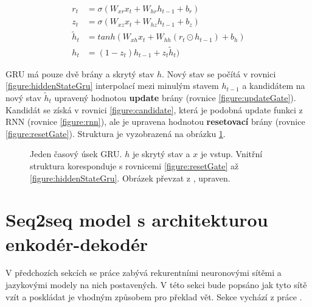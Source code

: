 \begin{align}
    r_{t}&=\sigma(W_{xr}x_{t}+W_{hr}h_{t-1}+b_{r}) \label{figure:resetGate} \\
    z_{t}&=\sigma(W_{xz}x_{t}+W_{hz}h_{t-1}+b_{z}) \label{figure:updateGate} \\
    \tilde{h}_{t}&=tanh(W_{xh}x_t + W_{hh}(r_t \odot h_{t-1}) + b_h) \label{figure:candidate} \\
    h_{t}&=(1 - z_t)h_{t-1} + z_{t}\tilde{h}_{t}) \label{figure:hiddenStateGru}
\end{align}

GRU má pouze dvě brány a skrytý stav $h$. Nový stav se počítá v rovnici \ref{figure:hiddenStateGru} interpolací mezi minulým stavem $h_{t-1}$ a kandidátem na nový stav $\tilde{h}_{t}$ upravený hodnotou \textbf{update} brány (rovnice \ref{figure:updateGate}). Kandidát se získá v rovnici \ref{figure:candidate}, která je podobná update funkci z RNN (rovnice \ref{figure:rnn}), ale je upravena hodnotou \textbf{resetovací} brány (rovnice \ref{figure:resetGate}). Struktura je vyzobrazená na obrázku \ref{img:GRU}.


\begin{figure}[H]
    \begin{center}
    \end{center}
	\caption{Jeden časový úsek GRU. $h$ je skrytý stav a $x$ je vstup. Vnitřní struktura koresponduje s rovnicemi \ref{figure:resetGate} až \ref{figure:hiddenStateGru}. Obrázek převzat z \cite{understandingLSTM}, upraven.}
	\label{img:GRU}
\end{figure}

\section{Seq2seq model s architekturou enkodér-dekodér} \label{section:encoderdecoder}
V předchozích sekcích se práce zabývá rekurentními neuronovými sítěmi a jazykovými modely na nich postavených. V této sekci bude popsáno jak tyto sítě vzít a poskládat je vhodným způsobem pro překlad vět. Sekce vychází z práce \cite{nmtTutorial}.

